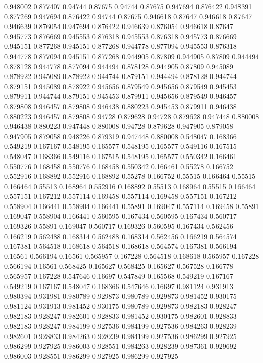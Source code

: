 0.948002 0.877407
0.94744 0.87675
0.94744 0.87675
0.947694 0.876422
0.948391 0.877269
0.947694 0.876422
0.94744 0.87675
0.946618 0.87647
0.946618 0.87647
0.946639 0.876054
0.947694 0.876422
0.946639 0.876054
0.946618 0.87647
0.945773 0.876669
0.945553 0.876318
0.945553 0.876318
0.945773 0.876669
0.945151 0.877268
0.945151 0.877268
0.944778 0.877094
0.945553 0.876318
0.944778 0.877094
0.945151 0.877268
0.944905 0.87809
0.944905 0.87809
0.944494 0.878128
0.944778 0.877094
0.944494 0.878128
0.944905 0.87809
0.945089 0.878922
0.945089 0.878922
0.944744 0.879151
0.944494 0.878128
0.944744 0.879151
0.945089 0.878922
0.945656 0.879549
0.945656 0.879549
0.945453 0.879911
0.944744 0.879151
0.945453 0.879911
0.945656 0.879549
0.946457 0.879808
0.946457 0.879808
0.946438 0.880223
0.945453 0.879911
0.946438 0.880223
0.946457 0.879808
0.94728 0.879628
0.94728 0.879628
0.947448 0.880008
0.946438 0.880223
0.947448 0.880008
0.94728 0.879628
0.947905 0.879058
0.947905 0.879058
0.948226 0.879319
0.947448 0.880008
0.548047 0.168366
0.549219 0.167167
0.548195 0.165577
0.548195 0.165577
0.549116 0.167515
0.548047 0.168366
0.549116 0.167515
0.548195 0.165577
0.550342 0.166461
0.550776 0.168458
0.550776 0.168458
0.550342 0.166461
0.55278 0.166752
0.552916 0.168892
0.552916 0.168892
0.55278 0.166752
0.55515 0.166464
0.55515 0.166464
0.55513 0.168964
0.552916 0.168892
0.55513 0.168964
0.55515 0.166464
0.557151 0.167212
0.557114 0.169458
0.557114 0.169458
0.557151 0.167212
0.558904 0.166441
0.558904 0.166441
0.55891 0.169047
0.557114 0.169458
0.55891 0.169047
0.558904 0.166441
0.560595 0.167434
0.560595 0.167434
0.560717 0.169326
0.55891 0.169047
0.560717 0.169326
0.560595 0.167434
0.562456 0.166219
0.562488 0.168314
0.562488 0.168314
0.562456 0.166219
0.564574 0.167381
0.564518 0.168618
0.564518 0.168618
0.564574 0.167381
0.566194 0.16561
0.566194 0.16561
0.565957 0.167228
0.564518 0.168618
0.565957 0.167228
0.566194 0.16561
0.568425 0.165627
0.568425 0.165627
0.567528 0.166778
0.565957 0.167228
0.547646 0.16697
0.547849 0.165568
0.549219 0.167167
0.549219 0.167167
0.548047 0.168366
0.547646 0.16697
0.981124 0.931913
0.980394 0.931981
0.980789 0.929873
0.980789 0.929873
0.981452 0.930175
0.981124 0.931913
0.981452 0.930175
0.980789 0.929873
0.982183 0.928247
0.982183 0.928247
0.982601 0.928833
0.981452 0.930175
0.982601 0.928833
0.982183 0.928247
0.984199 0.927536
0.984199 0.927536
0.984263 0.928239
0.982601 0.928833
0.984263 0.928239
0.984199 0.927536
0.986299 0.927925
0.986299 0.927925
0.986003 0.928551
0.984263 0.928239
0.987361 0.929692
0.986003 0.928551
0.986299 0.927925
0.986299 0.927925
